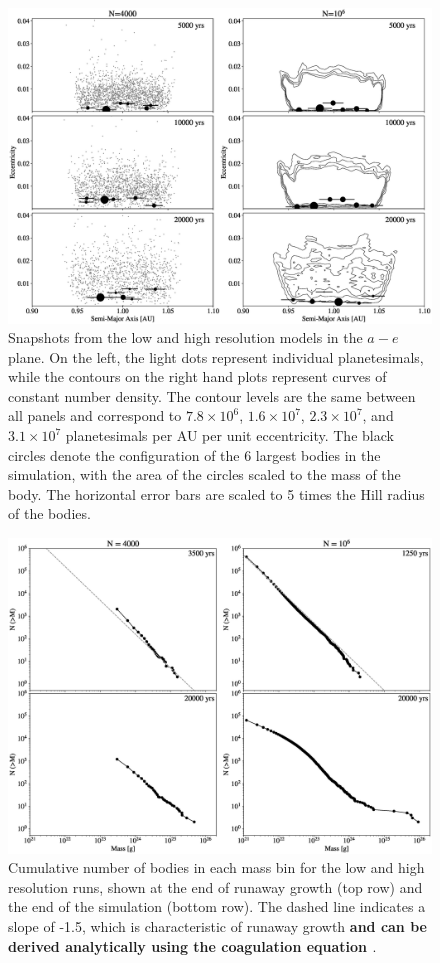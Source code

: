 \begin{figure}
    \includegraphics[width=\textwidth]{figures/plSS/ecc_evo.eps}
    \caption{Snapshots from the low and high resolution models in the $a-e$ plane. On the left, the light dots represent individual planetesimals, while the contours on the right hand plots represent curves of constant number density. The contour levels are the same between all panels and correspond to $7.8 \times 10^6$, $1.6 \times 10^7$, $2.3 \times 10^7$, and $3.1 \times 10^7$ planetesimals per AU per unit eccentricity. The black circles denote the configuration of the 6 largest bodies in the simulation, with the area of the circles scaled to the mass of the body. The horizontal error bars are scaled to 5 times the Hill radius of the bodies.
    \label{fig:ae}}
\end{figure}

\begin{figure}
    \includegraphics[width=\textwidth]{figures/plSS/mass_spectrum_evo.eps}
    \caption{Cumulative number of bodies in each mass bin for the low and high resolution runs, shown at the end of runaway growth (top row) and the end of the simulation (bottom row). The dashed line indicates a slope of -1.5, which is characteristic of runaway growth \textbf{and can be derived analytically using the coagulation equation \cite{mcleod62, trubnikov71}}. 
    \label{fig:mass_spectrum_evo}}
\end{figure}

